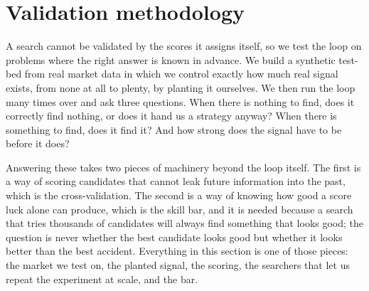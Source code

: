 \documentclass[11pt]{article}
\begin{document}
\section{Validation methodology}
\label{sec:method}

A search cannot be validated by the scores it assigns itself, so we test the
loop on problems where the right answer is known in advance. We build a synthetic test-bed from real
market data in which we control exactly how much real
signal exists, from none at all to plenty, by planting it ourselves. We then run the loop many times over
and ask three questions. When there is nothing to find, does it correctly find nothing, or does it hand
us a strategy anyway? When there is something to find, does it find it? And how strong does the signal
have to be before it does?

Answering these takes two pieces of machinery beyond the loop itself. The first is a way of scoring
candidates that cannot leak future information into the past, which is the cross-validation. The second
is a way of knowing how good a score luck alone can produce, which is the skill bar, and it is needed
because a search that tries thousands of candidates will always find something that looks good; the
question is never whether the best candidate looks good but whether it looks better than the best
accident. Everything in this section is one of those pieces: the market we test on, the planted signal,
the scoring, the searchers that let us repeat the experiment at scale, and the bar.
\end{document}
